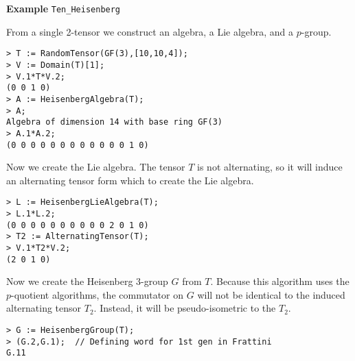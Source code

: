 \begin{framed} {\bf Example} {\tt Ten\_Heisenberg}\\
{\small From a single 2-tensor we construct an algebra, a Lie algebra, and a $p$-group.
\begin{lstlisting}[frame=single,basicstyle=\ttfamily\color{black!30!
teal},backgroundcolor=\color{white!70!gray}]
> T := RandomTensor(GF(3),[10,10,4]);
> V := Domain(T)[1];
> V.1*T*V.2;
(0 0 1 0)
> A := HeisenbergAlgebra(T);
> A;
Algebra of dimension 14 with base ring GF(3)
> A.1*A.2;
(0 0 0 0 0 0 0 0 0 0 0 0 1 0)
\end{lstlisting}
Now we create the Lie algebra. 
The tensor $T$ is not alternating, so it will induce an alternating tensor form which to create the Lie algebra.
\begin{lstlisting}[frame=single,basicstyle=\ttfamily\color{black!30!
teal},backgroundcolor=\color{white!70!gray}]
> L := HeisenbergLieAlgebra(T);
> L.1*L.2;
(0 0 0 0 0 0 0 0 0 0 2 0 1 0)
> T2 := AlternatingTensor(T);
> V.1*T2*V.2;
(2 0 1 0)
\end{lstlisting}
Now we create the Heisenberg $3$-group $G$ from $T$.
Because this algorithm uses the $p$-quotient algorithms, the commutator on $G$ will not be identical to the induced alternating tensor $T_2$. 
Instead, it will be pseudo-isometric to the $T_2$.
\begin{lstlisting}[frame=single,basicstyle=\ttfamily\color{black!30!
teal},backgroundcolor=\color{white!70!gray}]
> G := HeisenbergGroup(T);  
> (G.2,G.1);  // Defining word for 1st gen in Frattini
G.11
\end{lstlisting} }
\end{framed}
